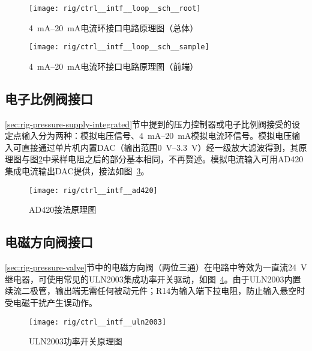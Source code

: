 
\begin{figure}[tb]
\centering
\texttt{[image: rig/ctrl\_\_intf\_\_loop\_\_sch\_\_root]}
\caption{\SIrange{4}{20}{\milli\ampere}电流环接口电路原理图（总体）}
\label{fig:rig-ctrl-intf-loop-sch-root}
\end{figure}

\begin{figure}[tb]
\centering
\texttt{[image: rig/ctrl\_\_intf\_\_loop\_\_sch\_\_sample]}
\caption{\SIrange{4}{20}{\milli\ampere}电流环接口电路原理图（前端）}
\label{fig:rig-ctrl-intf-loop-sch-sample}
\end{figure}

\subsection{电子比例阀接口}\label{sec:rig-ctrl-intf-reg}

\ref{sec:rig-pressure-supply-integrated}节中提到的压力控制器或电子比例阀接受的设定点输入分为两种：模拟电压信号、\SIrange{4}{20}{\milli\ampere}模拟电流环信号。模拟电压输入可直接通过单片机内置DAC（输出范围\SIrange{0}{3.3}{\volt}）经一级放大滤波得到，其原理图与图\ref{fig:rig-ctrl-intf-loop-sch-sample}中采样电阻之后的部分基本相同，不再赘述。模拟电流输入可用AD420集成电流输出DAC提供，接法如图~\ref{fig:rig-ctrl-intf-ad420}。

\begin{figure}[tbhp]
\centering
\texttt{[image: rig/ctrl\_\_intf\_\_ad420]}
\caption{AD420接法原理图}
\label{fig:rig-ctrl-intf-ad420}
\end{figure}

\subsection{电磁方向阀接口}\label{sec:rig-ctrl-intf-relay}

\ref{sec:rig-pressure-valve}节中的电磁方向阀（两位三通）在电路中等效为一直流\SI{24}{\volt}继电器，可使用常见的ULN2003集成功率开关驱动，如图~\ref{fig:rig-ctrl-intf-uln2003}。由于ULN2003内置续流二极管，输出端无需任何被动元件；R14为输入端下拉电阻，防止输入悬空时受电磁干扰产生误动作。

\begin{figure}[tbhp]
\centering
\texttt{[image: rig/ctrl\_\_intf\_\_uln2003]}
\caption{ULN2003功率开关原理图}
\label{fig:rig-ctrl-intf-uln2003}
\end{figure}

